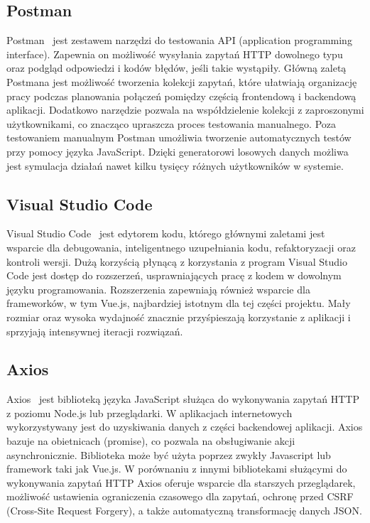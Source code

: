 \subsection{Postman}
Postman~\cite{postman} jest zestawem narzędzi do testowania API (application programming interface). Zapewnia on możliwość wysyłania zapytań HTTP dowolnego typu oraz podgląd odpowiedzi i kodów błędów, jeśli takie wystąpiły. Główną zaletą Postmana jest możliwość tworzenia kolekcji zapytań, które ułatwiają organizację pracy podczas planowania połączeń pomiędzy częścią frontendową i backendową aplikacji. Dodatkowo narzędzie pozwala na współdzielenie kolekcji z zaproszonymi użytkownikami, co znacząco upraszcza proces testowania manualnego. Poza testowaniem manualnym Postman umożliwia tworzenie automatycznych testów przy pomocy języka JavaScript. Dzięki generatorowi losowych danych możliwa jest symulacja działań nawet kilku tysięcy różnych użytkowników w systemie.
\subsection{Visual Studio Code}
Visual Studio Code~\cite{vscode} jest edytorem kodu, którego głównymi zaletami jest wsparcie dla debugowania, inteligentnego uzupełniania kodu, refaktoryzacji oraz kontroli wersji. Dużą korzyścią płynącą z korzystania z program Visual Studio Code jest dostęp do rozszerzeń, usprawniających pracę z kodem w dowolnym języku programowania. Rozszerzenia zapewniają również wsparcie dla frameworków, w tym Vue.js, najbardziej istotnym dla tej części projektu. Mały rozmiar oraz wysoka wydajność znacznie przyśpieszają korzystanie z aplikacji i sprzyjają intensywnej iteracji rozwiązań.
\subsection{Axios}
Axios~\cite{axios} jest biblioteką języka JavaScript służąca do wykonywania zapytań HTTP z poziomu Node.js lub przeglądarki. W aplikacjach internetowych wykorzystywany jest do uzyskiwania danych z części backendowej aplikacji. Axios bazuje na obietnicach (promise), co pozwala na obsługiwanie akcji asynchronicznie. Biblioteka może być użyta poprzez zwykły Javascript lub framework taki jak Vue.js. W porównaniu z innymi bibliotekami służącymi do wykonywania zapytań HTTP Axios oferuje wsparcie dla starszych przeglądarek, możliwość ustawienia ograniczenia czasowego dla zapytań, ochronę przed CSRF (Cross-Site Request Forgery), a także automatyczną transformację danych JSON.
